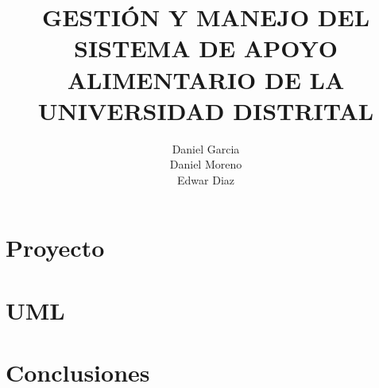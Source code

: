 \documentclass[11pt]{book}
\title{GESTIÓN Y MANEJO DEL SISTEMA DE APOYO ALIMENTARIO DE LA UNIVERSIDAD DISTRITAL}
\author{Daniel Garcia  \\ Daniel Moreno  \\ Edwar Diaz}
\begin{document}
	\maketitle
	\tableofcontents
\part{Proyecto}


\part{UML}



\part{Conclusiones}





\end{document}

